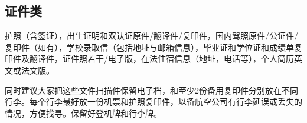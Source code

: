 \subsection{证件类}
护照（含签证），出生证明和双认证原件/翻译件/复印件，国内驾照原件/公证件/复印件（如有），学校录取信（包括地址与邮箱信息），毕业证和学位证和成绩单复印件及翻译件，证件照若干/电子版，在法住宿信息（地址，电话等），个人简历英文或法文版。

同时建议大家把这些文件扫描件保留电子档，和至少2份备用复印件分别放在不同行李。每个行李最好放一份机票和护照复印件，以备航空公司有行李延误或丢失的情况，方便找寻。保留好登机牌和行李牌。
